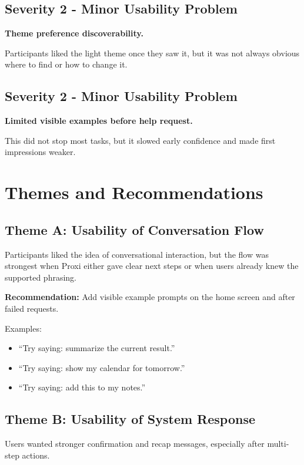 \documentclass[12pt, titlepage]{article}
\begin{document}
\subsection{Severity 2 - Minor Usability Problem}

\textbf{Theme preference discoverability.}

Participants liked the light theme once they saw it, but it was not
always obvious where to find or how to change it.

\subsection{Severity 2 - Minor Usability Problem}

\textbf{Limited visible examples before help request.}

This did not stop most tasks, but it slowed early confidence and made
first impressions weaker.

\section{Themes and Recommendations}

\subsection{Theme A: Usability of Conversation Flow}

Participants liked the idea of conversational interaction, but the flow
was strongest when Proxi either gave clear next steps or when users
already knew the supported phrasing.

\textbf{Recommendation:} Add visible example prompts on the home screen
and after failed requests.

Examples:
\begin{itemize}
    \item ``Try saying: summarize the current result.''
    \item ``Try saying: show my calendar for tomorrow.''
    \item ``Try saying: add this to my notes.''
\end{itemize}

\subsection{Theme B: Usability of System Response}

Users wanted stronger confirmation and recap messages, especially after
multi-step actions.
\end{document}
